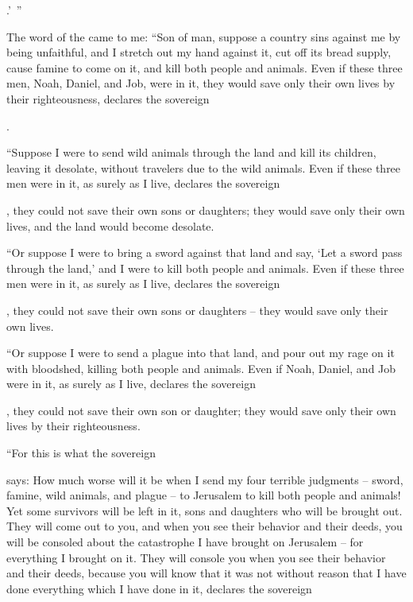 {{}.’ ”
\par }{\PP {}The word
of the {}
came to me:
“Son
of man,
suppose
a country
sins
against me by being
unfaithful,
and I stretch
out my hand
against
it,
cut off its bread
supply,
cause famine
to come on it, and kill both people
and animals.
Even if these
three
men,
Noah,
Daniel,
and Job,
were
in it, they
would save
only their own lives
by their righteousness,
declares
the sovereign

{}.
\par }{\PP {}“Suppose
I were to send wild animals
through
the land
and kill its children, leaving
it desolate,
without
travelers
due
to the wild animals.
Even if these three
men
were
in it,
as surely
as I
live, declares
the sovereign

{}, they could
not save their own sons
or
daughters;
they would save
only their own lives,
and the land
would become
desolate.
\par }{\PP {}“Or
suppose I were to bring
a sword
against
that land
and say,
‘Let a sword
pass
through the land,’
and I
were to kill
both people
and animals.
Even if these three
men
were
in it,
as surely
as I
live, declares
the sovereign

{}, they could not
save
their own sons
or daughters
– they
would save
only their own lives.
\par }{\PP {}“Or
suppose I were to send
a plague
into
that land,
and pour
out my rage
on
it with bloodshed,
killing
both people
and animals.
Even if Noah,
Daniel,
and Job
were in it,
as surely
as I
live, declares
the sovereign

{}, they could not
save their own son
or
daughter;
they
would save
only their own
lives
by their righteousness.
\par }{\PP {}“For
this is what
the sovereign

{}
says: How much
worse will it be when
I send
my four
terrible
judgments
– sword,
famine,
wild animals,
and plague
– to
Jerusalem
to kill
both people
and animals!
Yet some
survivors
will be left
in it, sons
and daughters
who will be brought
out.
They will come out
to
you, and when you see
their behavior
and their deeds,
you will be consoled
about the catastrophe
I have
brought
on
Jerusalem
– for everything
I brought
on it.
They will console
you when
you see
their behavior
and their deeds,
because
you will know
that
it was not
without reason
that I have done
everything
which
I have done
in it, declares
the sovereign

}
